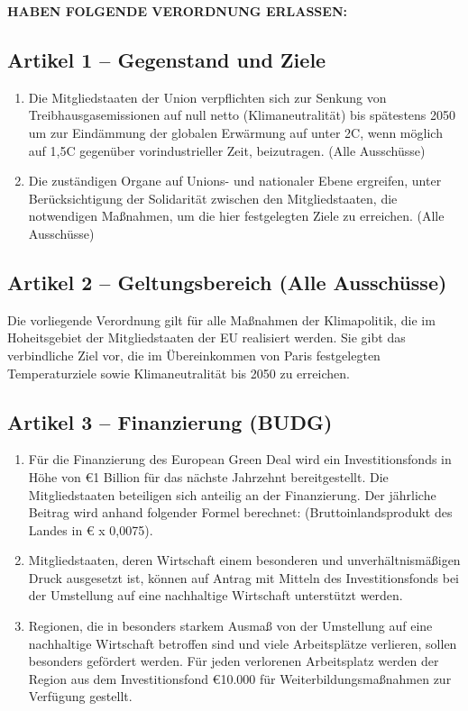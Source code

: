 \documentclass[12pt,a4paper]{article}
\begin{document}
\newpage

\noindent\textbf{HABEN FOLGENDE VERORDNUNG ERLASSEN:}

\subsection*{Artikel 1 – Gegenstand und Ziele}

\begin{enumerate}[leftmargin=2em, itemsep=2pt]
  \item Die Mitgliedstaaten der Union verpflichten sich zur Senkung von Treibhausgasemissionen auf null netto (Klimaneutralität) bis spätestens 2050 um zur Eindämmung der globalen Erwärmung auf unter 2\textdegree C, wenn möglich auf 1,5\textdegree C gegenüber vorindustrieller Zeit, beizutragen. (Alle Ausschüsse)
  \item Die zuständigen Organe auf Unions- und nationaler Ebene ergreifen, unter Berücksichtigung der Solidarität zwischen den Mitgliedstaaten, die notwendigen Maßnahmen, um die hier festgelegten Ziele zu erreichen. (Alle Ausschüsse)
\end{enumerate}

\subsection*{Artikel 2 – Geltungsbereich (Alle Ausschüsse)}

Die vorliegende Verordnung gilt für alle Maßnahmen der Klimapolitik, die im Hoheitsgebiet der Mitgliedstaaten der EU realisiert werden. Sie gibt das verbindliche Ziel vor, die im Übereinkommen von Paris festgelegten Temperaturziele sowie Klimaneutralität bis 2050 zu erreichen.

\subsection*{Artikel 3 – Finanzierung (BUDG)}

\begin{enumerate}[leftmargin=2em, itemsep=2pt]
  \item Für die Finanzierung des European Green Deal wird ein Investitionsfonds in Höhe von \euro{}1 Billion für das nächste Jahrzehnt bereitgestellt. Die Mitgliedstaaten beteiligen sich anteilig an der Finanzierung. Der jährliche Beitrag wird anhand folgender Formel berechnet: (Bruttoinlandsprodukt des Landes in \euro{} x 0,0075).
  \item Mitgliedstaaten, deren Wirtschaft einem besonderen und unverhältnismäßigen Druck ausgesetzt ist, können auf Antrag mit Mitteln des Investitionsfonds bei der Umstellung auf eine nachhaltige Wirtschaft unterstützt werden.
  \item Regionen, die in besonders starkem Ausmaß von der Umstellung auf eine nachhaltige Wirtschaft betroffen sind und viele Arbeitsplätze verlieren, sollen besonders gefördert werden. Für jeden verlorenen Arbeitsplatz werden der Region aus dem Investitionsfond \euro{}10.000 für Weiterbildungsmaßnahmen zur Verfügung gestellt.
\end{enumerate}
\end{document}
